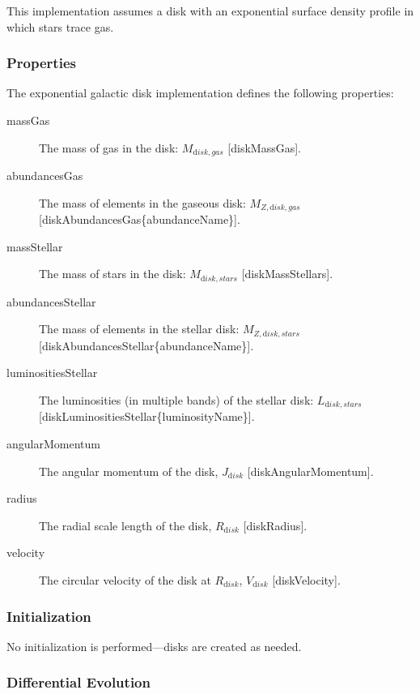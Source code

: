 This implementation assumes a disk with an exponential surface density profile in which stars trace gas.

\subsubsection{Properties}

The exponential galactic disk implementation defines the following properties:
\begin{description}
 \item [{\normalfont \ttfamily massGas}] The mass of gas in the disk: $M_{\mathrm disk, gas}$ [{\normalfont \ttfamily diskMassGas}].
 \item [{\normalfont \ttfamily abundancesGas}] The mass of elements in the gaseous disk: $M_{Z, {\mathrm disk, gas}}$ [{\normalfont \ttfamily diskAbundancesGas\{abundanceName\}}].
 \item [{\normalfont \ttfamily massStellar}] The mass of stars in the disk: $M_{\mathrm disk, stars}$ [{\normalfont \ttfamily diskMassStellars}].
 \item [{\normalfont \ttfamily abundancesStellar}] The mass of elements in the stellar disk: $M_{Z, {\mathrm disk, stars}}$ [{\normalfont \ttfamily diskAbundancesStellar\{abundanceName\}}].
 \item [{\normalfont \ttfamily luminositiesStellar}] The luminosities (in multiple bands) of the stellar disk: $L_{\mathrm disk, stars}$ [{\normalfont \ttfamily diskLuminositiesStellar\{luminosityName\}}].
 \item [{\normalfont \ttfamily angularMomentum}] The angular momentum of the disk, $J_{\mathrm disk}$ [{\normalfont \ttfamily diskAngularMomentum}].
 \item [{\normalfont \ttfamily radius}] The radial scale length of the disk, $R_{\mathrm disk}$ [{\normalfont \ttfamily diskRadius}].
 \item [{\normalfont \ttfamily velocity}] The circular velocity of the disk at $R_{\mathrm disk}$, $V_{\mathrm disk}$ [{\normalfont \ttfamily diskVelocity}].
\end{description}

\subsubsection{Initialization}

No initialization is performed---disks are created as needed.

\subsubsection{Differential Evolution}


